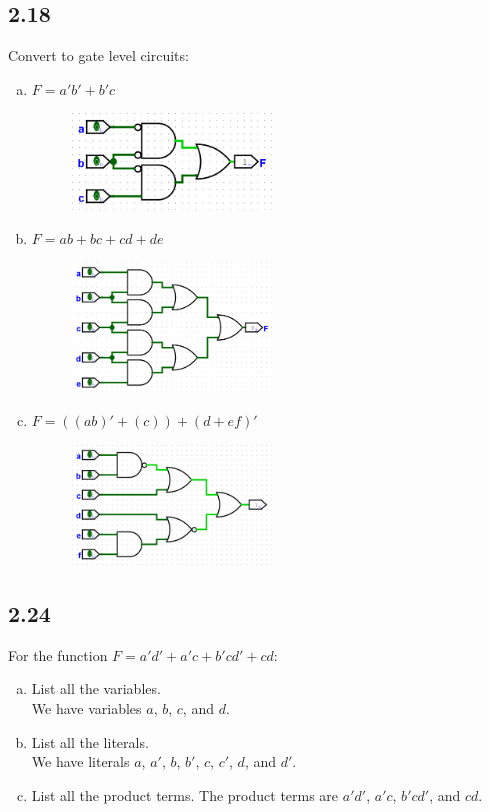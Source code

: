 \documentclass{article}
\begin{document}
\subsection*{2.18}
Convert to gate level circuits:
\begin{enumerate}[(a)]
    \item $F = a'b' + b'c$
    \begin{figure}[h]
        \centering
        \includegraphics[width=0.5\textwidth]{./images/2_18_a.png}
    \end{figure}
    \item $F = ab + bc + cd + de$
    \begin{figure}[h]
        \centering
        \includegraphics[width=0.5\textwidth]{./images/2_18_b.png}
    \end{figure}
    \newpage
    \item $F = ((ab)' + (c)) + (d + ef)'$
    \begin{figure}[h]
        \centering
        \includegraphics[width=0.5\textwidth]{./images/2_18_c.png}
    \end{figure}
\end{enumerate}

\subsection*{2.24}
For the function $F = a'd' + a'c + b'cd' + cd$:
\begin{enumerate}[(a)]
    \item List all the variables. \\
    We have variables $a$, $b$, $c$, and $d$.
    \item List all the literals. \\
    We have literals $a$, $a'$, $b$, $b'$, $c$, $c'$, $d$, and $d'$.
    \item List all the product terms.
    The product terms are $a'd'$, $a'c$, $b'cd'$, and $cd$.
\end{enumerate}
\end{document}

